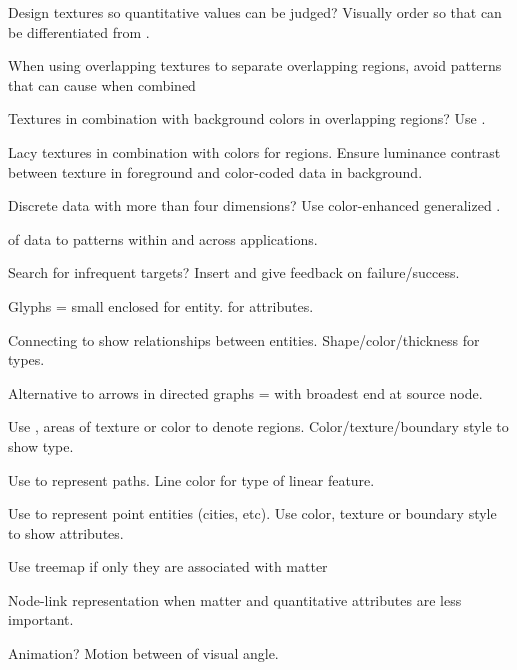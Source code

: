 \begin{compactenum}
    \item Design textures so quantitative values can be judged? Visually order
        so that  can be differentiated from .

    \item When using overlapping textures to separate overlapping regions,
        avoid patterns that can cause  when combined

    \item Textures in combination with background colors in overlapping
        regions? Use .

    \item Lacy textures in combination with colors for  regions.
        Ensure luminance contrast between texture in foreground and
        color-coded data in background.

    \item Discrete data with more than four dimensions? Use color-enhanced
        generalized .

    \item {} of data to patterns within and across
        applications.

    \item Search for infrequent targets? Insert  and give
        feedback on failure/success.

    \item Glyphs = small enclosed  for entity.  for
        attributes.

    \item Connecting  to show
        relationships between entities. Shape/color/thickness for types.

    \item Alternative to arrows in directed graphs =  with
        broadest end at source node.

    \item Use , areas of texture or color to denote regions.
        Color/texture/boundary style to show type.

    \item Use  to represent paths. Line color for type of linear feature.

    \item Use  to represent point entities (cities, etc).
        Use color, texture or boundary style to show attributes.

    \item Use treemap if only  they are associated
        with matter

    \item Node-link representation when  matter and
        quantitative attributes are less important.

    \item Animation? Motion between  of visual angle.

\end{compactenum}
